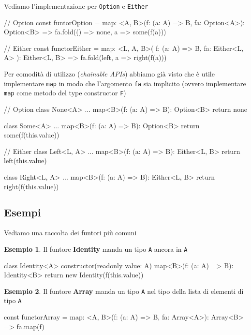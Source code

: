 \documentclass[12pt]{article}
\theoremstyle{definition}
\newtheorem{example}{Esempio}[section]
\newenvironment{code}
  {\vspace{0.5cm} \VerbatimEnvironment\begin{typescriptcode}}
  {\end{typescriptcode} \vspace{0.2cm}}
\begin{document}
Vediamo l'implementazione per \texttt{Option} e \texttt{Either}

\begin{code}
// Option
const funtorOption = {
  map: <A, B>(f: (a: A) => B, fa: Option<A>): Option<B> =>
    fa.fold(() => none, a => some(f(a)))
}

// Either
const functorEither = {
  map: <L, A, B>(
    f: (a: A) => B,
    fa: Either<L, A>
  ): Either<L, B> => fa.fold(left, a => right(f(a)))
}
\end{code}

Per comodità di utilizzo (\emph{chainable APIs}) abbiamo già visto che è utile implementare \texttt{map} in modo che
l'argomento \texttt{fa} sia implicito (ovvero implementare \texttt{map} come metodo del type constructor \texttt{F})

\begin{code}
// Option
class None<A> {
  ...
  map<B>(f: (a: A) => B): Option<B> {
    return none
  }
}

class Some<A> {
  ...
  map<B>(f: (a: A) => B): Option<B> {
    return some(f(this.value))
  }
}

// Either
class Left<L, A> {
  ...
  map<B>(f: (a: A) => B): Either<L, B> {
    return left(this.value)
  }
}

class Right<L, A> {
  ...
  map<B>(f: (a: A) => B): Either<L, B> {
    return right(f(this.value))
  }
}
\end{code}

\subsection{Esempi}

Vediamo una raccolta dei funtori più comuni

\begin{example}
Il funtore \textbf{Identity} manda un tipo \texttt{A} ancora in \texttt{A}

\begin{code}
class Identity<A> {
  constructor(readonly value: A) {}
  map<B>(f: (a: A) => B): Identity<B> {
    return new Identity(f(this.value))
  }
}
\end{code}
\end{example}

\begin{example}
Il funtore \textbf{Array} manda un tipo \texttt{A} nel tipo della lista di elementi di tipo \texttt{A}

\begin{code}
const functorArray = {
  map: <A, B>(f: (a: A) => B, fa: Array<A>): Array<B> =>
    fa.map(f)
}
\end{code}
\end{example}
\end{document}
